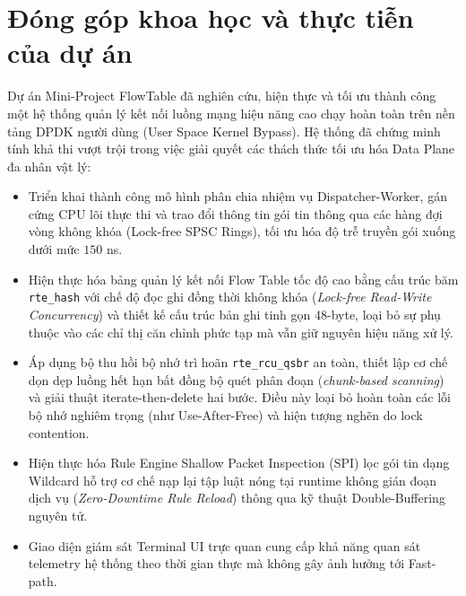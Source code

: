 \documentclass[12pt,a4paper,twoside]{report}
\begin{document}
\section{Đóng góp khoa học và thực tiễn của dự án}
Dự án Mini-Project FlowTable đã nghiên cứu, hiện thực và tối ưu thành công một hệ thống quản lý kết nối luồng mạng hiệu năng cao chạy hoàn toàn trên nền tảng DPDK người dùng (User Space Kernel Bypass). Hệ thống đã chứng minh tính khả thi vượt trội trong việc giải quyết các thách thức tối ưu hóa Data Plane đa nhân vật lý:
\begin{itemize}
    \item Triển khai thành công mô hình phân chia nhiệm vụ Dispatcher-Worker, gán cứng CPU lõi thực thi và trao đổi thông tin gói tin thông qua các hàng đợi vòng không khóa (Lock-free SPSC Rings), tối ưu hóa độ trễ truyền gói xuống dưới mức $150$ ns.
    \item Hiện thực hóa bảng quản lý kết nối Flow Table tốc độ cao bằng cấu trúc băm \texttt{rte\_hash} với chế độ đọc ghi đồng thời không khóa (\textit{Lock-free Read-Write Concurrency}) và thiết kế cấu trúc bản ghi tinh gọn 48-byte, loại bỏ sự phụ thuộc vào các chỉ thị căn chỉnh phức tạp mà vẫn giữ nguyên hiệu năng xử lý.
    \item Áp dụng bộ thu hồi bộ nhớ trì hoãn \texttt{rte\_rcu\_qsbr} an toàn, thiết lập cơ chế dọn dẹp luồng hết hạn bất đồng bộ quét phân đoạn (\textit{chunk-based scanning}) và giải thuật iterate-then-delete hai bước. Điều này loại bỏ hoàn toàn các lỗi bộ nhớ nghiêm trọng (như Use-After-Free) và hiện tượng nghẽn do lock contention.
    \item Hiện thực hóa Rule Engine Shallow Packet Inspection (SPI) lọc gói tin dạng Wildcard hỗ trợ cơ chế nạp lại tập luật nóng tại runtime không gián đoạn dịch vụ (\textit{Zero-Downtime Rule Reload}) thông qua kỹ thuật Double-Buffering nguyên tử.
    \item Giao diện giám sát Terminal UI trực quan cung cấp khả năng quan sát telemetry hệ thống theo thời gian thực mà không gây ảnh hưởng tới Fast-path.
\end{itemize}
\end{document}
